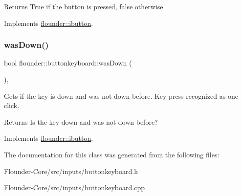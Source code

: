 \begin{DoxyReturn}{Returns}
True if the button is pressed, false otherwise. 
\end{DoxyReturn}


Implements \hyperlink{classflounder_1_1ibutton_af99b936d7329f74a27768ce6eb181327}{flounder\+::ibutton}.

\mbox{\label{classflounder_1_1buttonkeyboard_abc6b3c8cf9398f2a896408e390fd3a01}} 
\subsubsection{\texorpdfstring{was\+Down()}{wasDown()}}
{\footnotesize\ttfamily bool flounder\+::buttonkeyboard\+::was\+Down (\begin{DoxyParamCaption}{ }\end{DoxyParamCaption})\hspace{0.3cm}{\ttfamily [override]}, {\ttfamily [virtual]}}



Gets if the key is down and was not down before. Key press recognized as one click. 

\begin{DoxyReturn}{Returns}
Is the key down and was not down before? 
\end{DoxyReturn}


Implements \hyperlink{classflounder_1_1ibutton_a5fb7b3493c0ea0e67bb9defc272da0d3}{flounder\+::ibutton}.



The documentation for this class was generated from the following files\+:\begin{DoxyCompactItemize}
\item 
Flounder-\/\+Core/src/inputs/buttonkeyboard.\+h\item 
Flounder-\/\+Core/src/inputs/buttonkeyboard.\+cpp\end{DoxyCompactItemize}
